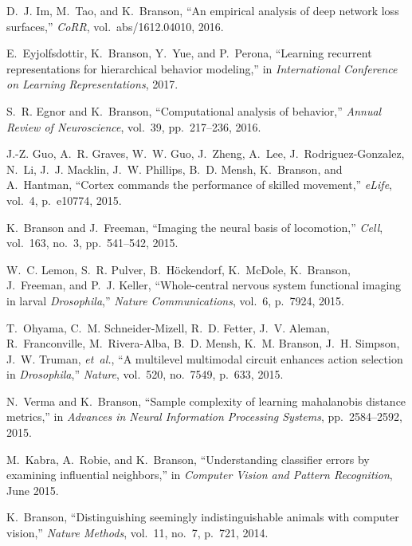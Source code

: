 \begin{cvenum}
\item D.~J. Im, M.~Tao, and K.~Branson, ``An empirical analysis of deep network loss
  surfaces,'' {\em CoRR}, vol.~abs/1612.04010, 2016.

\item E.~Eyjolfsdottir, K.~Branson, Y.~Yue, and P.~Perona,
  ``Learning recurrent representations for hierarchical behavior modeling,'' in
  {\em International Conference on Learning Representations},
  2017.

\item S.~R. Egnor and K.~Branson, ``Computational analysis of behavior,'' {\em Annual
  Review of Neuroscience}, vol.~39, pp.~217--236, 2016.

\item J.-Z. Guo, A.~R. Graves, W.~W. Guo, J.~Zheng, A.~Lee,
  J.~Rodriguez-Gonzalez, N.~Li, J.~J. Macklin, J.~W. Phillips, B.~D. Mensh,
  K.~Branson, and A.~Hantman, ``Cortex commands the performance of skilled
  movement,'' {\em e{L}ife}, vol.~4, p.~e10774, 2015.

\item K.~Branson and J.~Freeman, ``Imaging the neural basis of locomotion,'' {\em
  Cell}, vol.~163, no.~3, pp.~541--542, 2015.

\item W.~C. Lemon, S.~R. Pulver, B.~H{\"o}ckendorf, K.~McDole, K.~Branson,
  J.~Freeman, and P.~J. Keller, ``Whole-central nervous system functional
  imaging in larval {\em {{D}}rosophila},'' {\em Nature Communications}, vol.~6, p.~7924,
  2015.

\item T.~Ohyama, C.~M. Schneider-Mizell, R.~D. Fetter, J.~V. Aleman, R.~Franconville, M.~Rivera-Alba, B.~D. Mensh, K.~M. Branson, J.~H. Simpson, J.~W. Truman, {\em et~al.}, ``A multilevel multimodal circuit enhances action selection in {\em {{D}}rosophila},'' {\em Nature}, vol.~520, no.~7549, p.~633, 2015.

\item N.~Verma and K.~Branson, ``Sample complexity of learning mahalanobis distance metrics,'' in {\em Advances in Neural Information Processing Systems}, pp.~2584--2592, 2015.

\item M.~Kabra, A.~Robie, and K.~Branson, ``Understanding classifier errors by
  examining influential neighbors,'' in {\em Computer Vision and Pattern
  Recognition}, June 2015.

\item K.~Branson, ``Distinguishing seemingly indistinguishable animals with computer
  vision,'' {\em Nature Methods}, vol.~11, no.~7, p.~721, 2014.


\end{cvenum}
